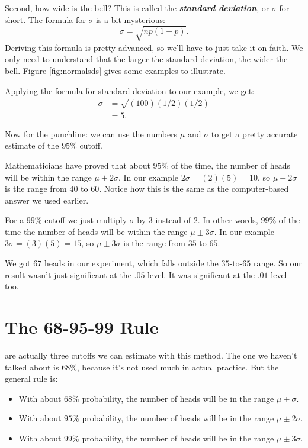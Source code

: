 \documentclass[justified]{tufte-book}
\providecommand{\tightlist}{%
  \setlength{\itemsep}{0pt}\setlength{\parskip}{0pt}}
\theoremstyle{definition}
\theoremstyle{definition}
\theoremstyle{definition}
\theoremstyle{remark}
\begin{document}
Second, how wide is the bell? This is called the \textbf{\emph{standard deviation}}, or \(\sigma\) for short. The formula for \(\sigma\) is a bit mysterious:
\[ \sigma = \sqrt{np(1-p)}. \]
Deriving this formula is pretty advanced, so we'll have to just take it on faith. We only need to understand that the larger the standard deviation, the wider the bell. Figure \ref{fig:normalsds} gives some examples to illustrate.

Applying the formula for standard deviation to our example, we get:
\[
  \begin{aligned}
    \sigma &= \sqrt{(100)(1/2)(1/2)}\\
           &= 5.
  \end{aligned}
\]

Now for the punchline: we can use the numbers \(\mu\) and \(\sigma\) to get a pretty accurate estimate of the \(95\%\) cutoff.

Mathematicians have proved that about \(95\%\) of the time, the number of heads will be within the range \(\mu \pm 2\sigma\). In our example \(2\sigma = (2)(5) = 10\), so \(\mu \pm 2\sigma\) is the range from \(40\) to \(60\). Notice how this is the same as the computer-based answer we used earlier.

For a \(99\%\) cutoff we just multiply \(\sigma\) by \(3\) instead of \(2\). In other words, \(99\%\) of the time the number of heads will be within the range \(\mu \pm 3\sigma\). In our example \(3\sigma = (3)(5) = 15\), so \(\mu \pm 3\sigma\) is the range from \(35\) to \(65\).

We got \(67\) heads in our experiment, which falls outside the \(35\)-to-\(65\) range. So our result wasn't just significant at the \(.05\) level. It was significant at the \(.01\) level too.

\hypertarget{the-68-95-99-rule}{%
\section{The 68-95-99 Rule}\label{the-68-95-99-rule}}

 are actually three cutoffs we can estimate with this method. The one we haven't talked about is \(68\%\), because it's not used much in actual practice. But the general rule is:

\begin{itemize}
\tightlist
\item
  With about \(68\%\) probability, the number of heads will be in the range \(\mu \pm \sigma\).
\item
  With about \(95\%\) probability, the number of heads will be in the range \(\mu \pm 2\sigma\).
\item
  With about \(99\%\) probability, the number of heads will be in the range \(\mu \pm 3\sigma\).
\end{itemize}
\end{document}
